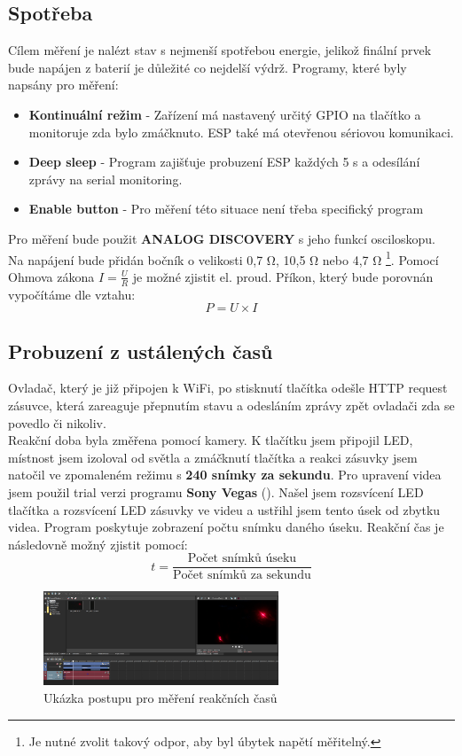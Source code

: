 \documentclass[a4paper, 12pt]{report}
\begin{document}
    \subsection{Spotřeba}
    \label{subsec:ustalene-stavy-spotreba}
    Cílem měření je nalézt stav s nejmenší spotřebou energie, jelikož finální prvek bude napájen z baterií je důležité co nejdelší výdrž. Programy, které byly napsány pro měření:\\
    \begin{itemize}
        \item \textbf{Kontinuální režim} - Zařízení má nastavený určitý GPIO na tlačítko a monitoruje zda bylo zmáčknuto. ESP také má otevřenou sériovou komunikaci.
        \item \textbf{Deep sleep} - Program zajišťuje probuzení ESP každých 5 \si{s} a odesílání zprávy na serial monitoring.
        \item \textbf{Enable button} - Pro měření této situace není třeba specifický program
    \end{itemize}
    Pro měření bude použit \textbf{ANALOG DISCOVERY} s jeho funkcí osciloskopu. Na napájení bude přidán bočník o velikosti 0,7 \si{\ohm}, 10,5 \si{\ohm} nebo 4,7 \si{\ohm} \footnote{Je nutné zvolit takový odpor, aby byl úbytek napětí měřitelný.}. Pomocí Ohmova zákona $ I = \frac{U}{R} $ je možné zjistit el. proud.
    Příkon, který bude porovnán vypočítáme dle vztahu:
    \[P = U \times I\]

    \subsection{Probuzení z ustálených časů}
    \label{subsec:ustalene-stavy-reakce}
    Ovladač, který je již připojen k WiFi, po stisknutí tlačítka odešle HTTP request zásuvce, která zareaguje přepnutím stavu a odesláním zprávy zpět ovladači zda se povedlo či nikoliv.\\
    Reakční doba byla změřena pomocí kamery. K tlačítku jsem připojil LED, místnost jsem izoloval od světla a zmáčknutí tlačítka a reakci zásuvky jsem natočil ve zpomaleném režimu s \textbf{240 snímky za sekundu}. Pro upravení videa jsem použil trial verzi programu \textbf{Sony Vegas} (). Našel jsem rozsvícení LED tlačítka a rozsvícení LED zásuvky ve videu a ustřihl jsem tento úsek od zbytku videa. Program poskytuje zobrazení počtu snímku daného úseku. Reakční čas je následovně možný zjistit pomocí:
    \[ t = \frac{\textrm{Počet snímků úseku}}{\textrm{Počet snímků za sekundu}}\]
    \begin{figure}[h]
        \centering
        \includegraphics[width=7cm]{images/sonyvegaspostup}
        \caption{Ukázka postupu pro měření reakčních časů}
        \label{fig:sonyvegaspostup}
    \end{figure}
\end{document}
